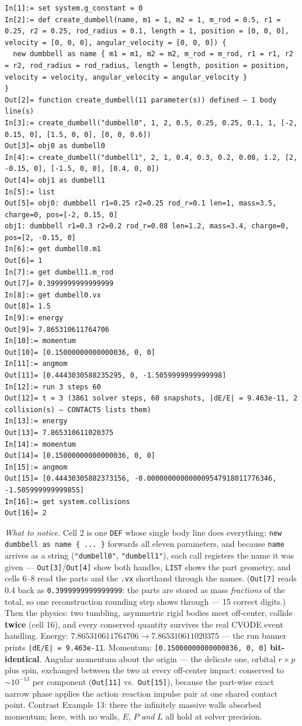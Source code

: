 \documentclass[11pt]{article}
\newcommand{\kw}[1]{\texttt{\uppercase{#1}}}
\newcommand{\code}[1]{\texttt{#1}}
\begin{document}
\begin{lstlisting}
In[1]:= set system.g_constant = 0
In[2]:= def create_dumbell(name, m1 = 1, m2 = 1, m_rod = 0.5, r1 = 0.25, r2 = 0.25, rod_radius = 0.1, length = 1, position = [0, 0, 0], velocity = [0, 0, 0], angular_velocity = [0, 0, 0]) {
  new dumbbell as name { m1 = m1, m2 = m2, m_rod = m_rod, r1 = r1, r2 = r2, rod_radius = rod_radius, length = length, position = position, velocity = velocity, angular_velocity = angular_velocity }
}
Out[2]= function create_dumbell(11 parameter(s)) defined — 1 body line(s)
In[3]:= create_dumbell("dumbell0", 1, 2, 0.5, 0.25, 0.25, 0.1, 1, [-2, 0.15, 0], [1.5, 0, 0], [0, 0, 0.6])
Out[3]= obj0 as dumbell0
In[4]:= create_dumbell("dumbell1", 2, 1, 0.4, 0.3, 0.2, 0.08, 1.2, [2, -0.15, 0], [-1.5, 0, 0], [0.4, 0, 0])
Out[4]= obj1 as dumbell1
In[5]:= list
Out[5]= obj0: dumbbell r1=0.25 r2=0.25 rod_r=0.1 len=1, mass=3.5, charge=0, pos=[-2, 0.15, 0]
obj1: dumbbell r1=0.3 r2=0.2 rod_r=0.08 len=1.2, mass=3.4, charge=0, pos=[2, -0.15, 0]
In[6]:= get dumbell0.m1
Out[6]= 1
In[7]:= get dumbell1.m_rod
Out[7]= 0.3999999999999999
In[8]:= get dumbell0.vx
Out[8]= 1.5
In[9]:= energy
Out[9]= 7.865310611764706
In[10]:= momentum
Out[10]= [0.15000000000000036, 0, 0]
In[11]:= angmom
Out[11]= [0.4443030588235295, 0, -1.5059999999999998]
In[12]:= run 3 steps 60
Out[12]= t = 3 (3861 solver steps, 60 snapshots, |dE/E| = 9.463e-11, 2 collision(s) — CONTACTS lists them)
In[13]:= energy
Out[13]= 7.865310611020375
In[14]:= momentum
Out[14]= [0.15000000000000036, 0, 0]
In[15]:= angmom
Out[15]= [0.44430305882373156, -0.000000000000009547918011776346, -1.505999999999855]
In[16]:= get system.collisions
Out[16]= 2
\end{lstlisting}

\emph{What to notice.} Cell 2 is one \kw{def} whose single body line
does everything: \code{new dumbbell as name \{ ... \}} forwards all
eleven parameters, and because \code{name} arrives as a string
(\code{"dumbell0"}, \code{"dumbell1"}), each call registers the name
it was given --- \code{Out[3]}/\code{Out[4]} show both handles,
\kw{list} shows the part geometry, and cells 6--8 read the parts and
the \code{.vx} shorthand through the names. (\code{Out[7]} reads 0.4
back as \code{0.3999999999999999}: the parts are stored as mass
\emph{fractions} of the total, so one reconstruction rounding step
shows through --- 15 correct digits.) Then the physics: two tumbling,
asymmetric rigid bodies meet off-center, collide \textbf{twice} (cell
16), and every conserved quantity survives the real CVODE event
handling. Energy: $7.865310611764706 \to 7.865310611020375$ --- the
run banner prints \code{|dE/E| = 9.463e-11}. Momentum:
\code{[0.15000000000000036, 0, 0]} \textbf{bit-identical}. Angular
momentum about the origin --- the delicate one, orbital $r \times p$
plus spin, exchanged between the two at every off-center impact:
conserved to $\sim\!10^{-13}$ per component (\code{Out[11]} vs.\
\code{Out[15]}), because the part-wise exact narrow phase applies the
action--reaction impulse pair at one shared contact point. Contrast
Example 13: there the infinitely massive walls absorbed momentum;
here, with no walls, $E$, $P$ \emph{and} $L$ all hold at solver
precision.
\end{document}
